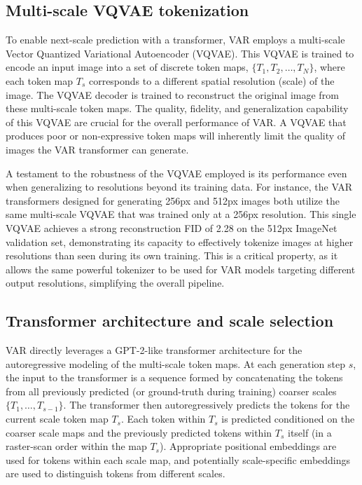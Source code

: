 \documentclass{article}
\begin{document}
\subsection{Multi-scale VQVAE tokenization}
\label{ssec:vqvae_tokenization}

To enable next-scale prediction with a transformer, VAR employs a multi-scale Vector Quantized Variational Autoencoder (VQVAE). This VQVAE is trained to encode an input image into a set of discrete token maps, $\{T_1, T_2, \ldots, T_N\}$, where each token map $T_s$ corresponds to a different spatial resolution (scale) of the image. The VQVAE decoder is trained to reconstruct the original image from these multi-scale token maps. The quality, fidelity, and generalization capability of this VQVAE are crucial for the overall performance of VAR. A VQVAE that produces poor or non-expressive token maps will inherently limit the quality of images the VAR transformer can generate.

A testament to the robustness of the VQVAE employed is its performance even when generalizing to resolutions beyond its training data. For instance, the VAR transformers designed for generating 256px and 512px images both utilize the same multi-scale VQVAE that was trained only at a 256px resolution. This single VQVAE achieves a strong reconstruction FID of 2.28 on the 512px ImageNet validation set, demonstrating its capacity to effectively tokenize images at higher resolutions than seen during its own training. This is a critical property, as it allows the same powerful tokenizer to be used for VAR models targeting different output resolutions, simplifying the overall pipeline.

\subsection{Transformer architecture and scale selection}
\label{ssec:transformer_scale_selection}

VAR directly leverages a GPT-2-like transformer architecture for the autoregressive modeling of the multi-scale token maps. At each generation step $s$, the input to the transformer is a sequence formed by concatenating the tokens from all previously predicted (or ground-truth during training) coarser scales $\{T_1, \ldots, T_{s-1}\}$. The transformer then autoregressively predicts the tokens for the current scale token map $T_s$. Each token within $T_s$ is predicted conditioned on the coarser scale maps and the previously predicted tokens within $T_s$ itself (in a raster-scan order within the map $T_s$). Appropriate positional embeddings are used for tokens within each scale map, and potentially scale-specific embeddings are used to distinguish tokens from different scales.
\end{document}
